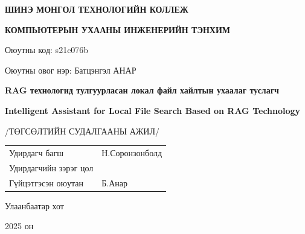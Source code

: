 \documentclass[11pt,a4paper]{article}
\begin{document}
\begin{titlepage}
    \thispagestyle{empty}
    \centering
    \vspace*{1cm}
    {\Large \textbf{ШИНЭ МОНГОЛ ТЕХНОЛОГИЙН КОЛЛЕЖ}}
    \vspace{0.5cm}

    {\large \textbf{КОМПЬЮТЕРЫН УХААНЫ ИНЖЕНЕРИЙН ТЭНХИМ}}
    \vspace{2cm}

    {\large Оюутны код: s21c076b}

    {\large Оюутны овог нэр: Батцэнгэл АНАР}
    \vspace{2cm}

      {\fontsize{14pt}{16pt}\selectfont\textbf{RAG технологид тулгуурласан локал файл хайлтын ухаалаг туслагч}\par}
      \vspace{0.25cm}
      {\fontsize{11pt}{13pt}\selectfont\textbf{Intelligent Assistant for Local File Search Based on RAG Technology}\par}
      \vspace{0.5cm}

    {\large /ТӨГСӨЛТИЙН СУДАЛГААНЫ АЖИЛ/}

    \vfill

      \begin{tabular}{ll}
            Удирдагч багш      & Н.Соронзонболд \\
            Удирдагчийн зэрэг цол & \underline{\hspace{4.5cm}} \\
            Гүйцэтгэсэн оюутан & Б.Анар
      \end{tabular}

    \vspace{1cm}
    {\large Улаанбаатар хот}

    {\large 2025 он}
\end{titlepage}
\end{document}
